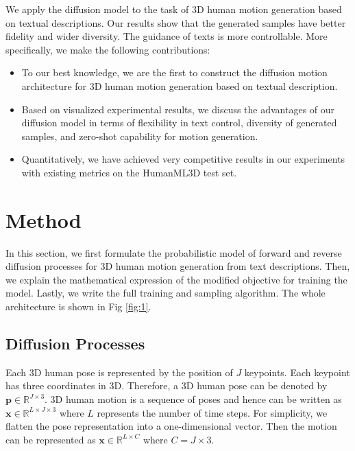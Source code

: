 \documentclass{article}
\begin{document}
We apply the diffusion model to the task of 3D human motion generation based on textual descriptions. Our results show that the generated samples have better fidelity and wider diversity. The guidance of texts is more controllable. More specifically, we make the following contributions:

\begin{itemize}
    \item To our best knowledge, we are the first to construct the diffusion motion architecture for 3D human motion generation based on textual description.
    \item Based on visualized experimental results, we discuss the advantages of our diffusion model in terms of flexibility in text control, diversity of generated samples, and zero-shot capability for motion generation.
    \item Quantitatively, we have achieved very competitive  results in our experiments with existing metrics on the HumanML3D test set.
\end{itemize}



\section{Method}
In this section, we first formulate the probabilistic model of forward and reverse diffusion processes for 3D human motion generation from text descriptions. Then, we explain the mathematical expression of the modified objective for training the model. Lastly, we write the full training and sampling algorithm. The whole architecture is shown in Fig \ref{fig:1}.

\subsection{Diffusion Processes}
Each 3D human pose is represented by the position of $J$  keypoints. Each keypoint has three coordinates in 3D. Therefore, a 3D human pose can be denoted by $\mathbf{p}  \in \mathbb{R}^{J \times 3}$. 3D human motion is a sequence of poses and hence can be written as $\mathbf{x}  \in \mathbb{R}^{L\times J \times 3}$ where $L$ represents the number of time steps. For simplicity, we flatten the pose representation into a one-dimensional vector. Then the motion can be represented as $\mathbf{x}  \in \mathbb{R}^{L\times C}$ where $C = J \times 3$. 
\end{document}
